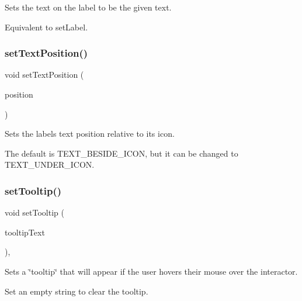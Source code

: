 Sets the text on the label to be the given text. 

Equivalent to set\+Label. \mbox{\label{classsgl_1_1GLabel_af822b8d73c652f7c59d875d7cdfc5302}} 
\subsubsection{\texorpdfstring{set\+Text\+Position()}{setTextPosition()}}
{\footnotesize\ttfamily void set\+Text\+Position (\begin{DoxyParamCaption}\item[{\mbox{\hyperlink{classsgl_1_1GInteractor_a8e0d441725a81d2bbdebbea09078260e}{G\+Interactor\+::\+Text\+Position}}}]{position }\end{DoxyParamCaption})\hspace{0.3cm}{\ttfamily [virtual]}}



Sets the label\textquotesingle{}s text position relative to its icon. 

The default is T\+E\+X\+T\+\_\+\+B\+E\+S\+I\+D\+E\+\_\+\+I\+C\+ON, but it can be changed to T\+E\+X\+T\+\_\+\+U\+N\+D\+E\+R\+\_\+\+I\+C\+ON. \mbox{\label{classsgl_1_1GInteractor_a039e0e49beaecc275efce02d416acea8}} 
\subsubsection{\texorpdfstring{set\+Tooltip()}{setTooltip()}}
{\footnotesize\ttfamily void set\+Tooltip (\begin{DoxyParamCaption}\item[{const std\+::string \&}]{tooltip\+Text }\end{DoxyParamCaption})\hspace{0.3cm}{\ttfamily [virtual]}, {\ttfamily [inherited]}}



Sets a \char`\"{}tooltip\char`\"{} that will appear if the user hovers their mouse over the interactor. 

Set an empty string to clear the tooltip. \mbox{\label{classsgl_1_1GLabel_afcc2a51afef8e2e61d8d9191386fb93f}} 
